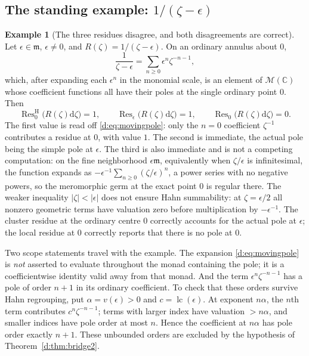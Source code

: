 \documentclass[11pt,a4paper]{article}
\numberwithin{equation}{section}
\theoremstyle{definition}
\newtheorem{example}[theorem]{Example}
\theoremstyle{remark}
\theoremstyle{plain}
\newcommand{\CC}{\mathbb C}
\newcommand{\mm}{\mathfrak m}
\newcommand{\Mc}{\mathcal M}
\DeclareMathOperator{\Res}{Res}                 %
\newcommand{\ResH}[1]{\Res^{\mathrm H}_{#1}}    %
\newcommand{\Resat}[1]{\Res_{#1}}               %
\newcommand{\abs}[1]{\lvert #1\rvert}
\newcommand{\dd}{\mathrm d}
\begin{document}
\subsection{The standing example: \texorpdfstring{$1/(\zeta-\epsilon)$}{1/(zeta-eps)}}
\label{d:sub:standingexample}

\begin{example}[The three residues disagree, and both disagreements are correct]
\label{d:ex:movingpole}
Let $\epsilon\in\mm$, $\epsilon\ne0$, and
$R(\zeta)=1/(\zeta-\epsilon)$.  On an ordinary annulus about $0$,
\begin{equation}\label{d:eq:movingpole}
 \frac1{\zeta-\epsilon}=\sum_{n\ge0}\epsilon^{n}\zeta^{-n-1},
\end{equation}
which, after expanding each $\epsilon^{n}$ in the monomial scale, is an
element of $\Mc(\CC)$ whose coefficient functions all have their poles
at the single ordinary point $0$.  Then
\[
 \ResH{0}\bigl(R(\zeta)\dd\zeta\bigr)=1,
 \qquad
 \Resat{\epsilon}\bigl(R(\zeta)\dd\zeta\bigr)=1,
 \qquad
 \Resat{0}\bigl(R(\zeta)\dd\zeta\bigr)=0 .
\]
The first value is read off \eqref{d:eq:movingpole}: only the $n=0$
coefficient $\zeta^{-1}$ contributes a residue at $0$, with value $1$.
The second is immediate, the actual pole being the simple pole at
$\epsilon$.  The third is also immediate and is not a competing
computation: on the fine neighborhood $\epsilon\mm$, equivalently when
$\zeta/\epsilon$ is infinitesimal, the function expands as $-\epsilon^{-1}\sum_{n\ge0}(\zeta/\epsilon)^{n}$, a power
series with no negative powers, so the meromorphic germ at the exact
point $0$ is regular there. The weaker inequality
$\abs\zeta<\abs\epsilon$ does not ensure Hahn summability: at
$\zeta=\epsilon/2$ all nonzero geometric terms have valuation zero
before multiplication by $-\epsilon^{-1}$.  The cluster residue at the ordinary centre
$0$ correctly accounts for the actual pole at $\epsilon$; the local
residue at $0$ correctly reports that there is no pole at $0$.

Two scope statements travel with the example.  The expansion
\eqref{d:eq:movingpole} is \emph{not} asserted to evaluate throughout
the monad containing the pole; it is a coefficientwise identity valid
away from that monad.  And the term $\epsilon^{n}\zeta^{-n-1}$
has a pole of order $n+1$ in its ordinary coefficient. To check that
these orders survive Hahn regrouping, put $\alpha=v(\epsilon)>0$ and
$c=\operatorname{lc}(\epsilon)$. At exponent $n\alpha$, the $n$th term
contributes $c^n\zeta^{-n-1}$; terms with larger index have valuation
$>n\alpha$, and smaller indices have pole order at most $n$. Hence the
coefficient at $n\alpha$ has pole order exactly $n+1$. These unbounded
orders are excluded by the hypothesis of Theorem~\ref{d:thm:bridge2}.
\end{example}
\end{document}
